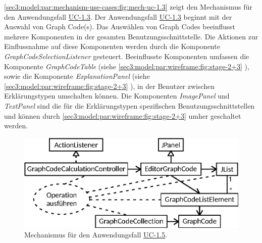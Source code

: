 \cref{sec3:model:par:mechanism-use-cases:fig:mech-uc-1.3} zeigt den Mechanismus für den Anwendungsfall \hyperref[sec3:model:uc-1.3]{UC-1.3}.
Der Anwendungsfall \hyperref[sec3:model:uc-1.3]{UC-1.3} beginnt mit der Auswahl von Graph Code(s).
Das Auswählen von Graph Codes beeinflusst mehrere Komponenten in der gesamten Benutzungsschnittstelle.
Die Aktionen zur Einflussnahme auf diese Komponenten werden durch die Komponente \textit{GraphCodeSelectionListener} gesteuert.
Beeinflusste Komponenten umfassen die Komponente \textit{GraphCodeTable} (siehe \cref{sec3:model:par:wireframe:fig:stage-2+3} ), sowie die Komponente \textit{ExplanationPanel} (siehe \cref{sec3:model:par:wireframe:fig:stage-2+3} ), in der Benutzer zwischen Erklärungstypen umschalten können.
Die Komponenten \textit{ImagePanel} und \textit{TextPanel} sind die für die Erklärungstypen spezifischen Benutzungsschnittstellen und können durch \cref{sec3:model:par:wireframe:fig:stage-2+3}  umher geschaltet werden.

\begin{figure}[htb]
    \centering
    \includegraphics{chapter/chapter_3/mechanisms/mechanism-uc-1.5.eps}
    \caption{Mechanismus für den Anwendungsfall \hyperref[sec3:model:uc-1.5]{UC-1.5}.}
    \label{sec3:model:par:mechanism-use-cases:fig:mech-uc-1.5}
\end{figure}

